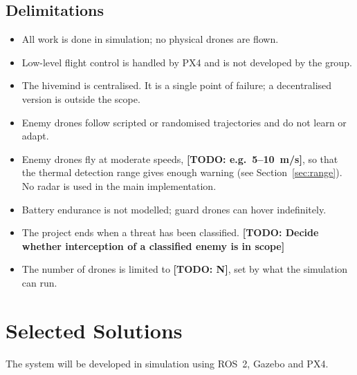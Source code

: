 \documentclass{article}
\newcommand{\todo}[1]{\textbf{[TODO: #1]}}
\begin{document}
\subsection{Delimitations}
\begin{itemize}
    \item All work is done in simulation; no physical drones are flown.
    \item Low-level flight control is handled by PX4 and is not developed
          by the group.
    \item The hivemind is centralised. It is a single point of failure;
          a decentralised version is outside the scope.
    \item Enemy drones follow scripted or randomised trajectories and do
          not learn or adapt.
    \item Enemy drones fly at moderate speeds, \todo{e.g.\ 5--10~m/s}, so
          that the thermal detection range gives enough warning (see
          Section~\ref{sec:range}). No radar is used in the main
          implementation.
    \item Battery endurance is not modelled; guard drones can hover
          indefinitely.
    \item The project ends when a threat has been classified.
          \todo{Decide whether interception of a classified enemy is in scope}
    \item The number of drones is limited to \todo{N}, set by what the
          simulation can run.
\end{itemize}

\section{Selected Solutions}
The system will be developed in simulation using ROS~2, Gazebo and PX4.

\cite{tan2014introduction}
\end{document}
